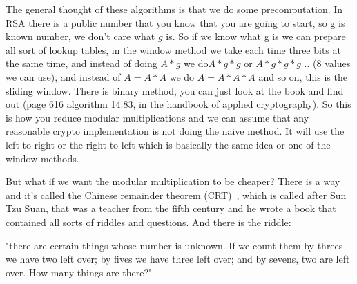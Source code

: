 The general thought of these algorithms is that we do some precomputation. In RSA there is a public number that you know that you are going to start, so g is known number, we don’t care what $g$ is. So if we know what g is we can prepare all sort of lookup tables, in the window method we take each time three bits at the same time, and instead of doing \(A*g\) we do\( A*g*g\) or \(A*g*g*g\) .. (8 values we can use), and instead of \( A=A*A\) we do \(A=A*A*A\) and so on, this is the sliding window. There is binary method, you can just look at the book and find out (page 616 algorithm 14.83, in the handbook of applied cryptography). So this is how you reduce modular multiplications and we can assume that any reasonable crypto implementation is not doing the naive method. It will use the left to right or the right to left which is basically the same idea or one of the window methods.

But what if we want the modular multiplication to be cheaper? There is a way and it's called the Chinese remainder theorem (CRT)~\cite{dingyi1996chinese}, which is called after Sun Tzu Suan, that was a teacher from the fifth century and he wrote a book that contained all sorts of riddles and questions. And there is the riddle: 

"there are certain things whose number is unknown.  If we count them by threes we have two left over; by fives we have three left over; and by sevens, two are left over. How many things are there?" 

